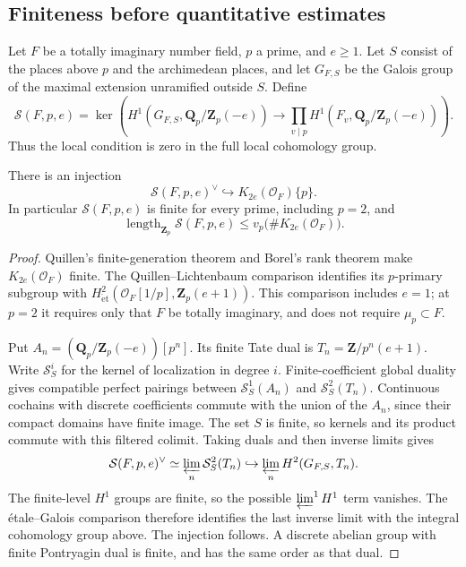 \subsection{Finiteness before quantitative estimates}

Let \(F\) be a totally imaginary number field, \(p\) a prime,
and \(e\ge1\).  Let \(S\) consist of the places above \(p\)
and the archimedean places, and let \(G_{F,S}\) be the Galois
group of the maximal extension unramified outside \(S\).  Define
\[
 \mathcal S(F,p,e)=\ker\left(
 H^1(G_{F,S},\mathbf Q_p/\mathbf Z_p(-e))
 \longrightarrow\prod_{v\mid p}
             H^1(F_v,\mathbf Q_p/\mathbf Z_p(-e))\right).
\]
Thus the local condition is zero in the full local cohomology group.

\begin{proposition}\label{shared-selmer-finite}
There is an injection
\[
 \mathcal S(F,p,e)^\vee\hookrightarrow K_{2e}(\mathcal O_F)\{p\}.
\]
In particular \(\mathcal S(F,p,e)\) is finite for every prime,
including \(p=2\), and
\[
 \operatorname{length}_{\mathbf Z_p}\mathcal S(F,p,e)
       \le v_p\bigl(\#K_{2e}(\mathcal O_F)\bigr).
\]
\end{proposition}
\begin{proof}
Quillen's finite-generation theorem and Borel's rank theorem make
\(K_{2e}(\mathcal O_F)\) finite.  The Quillen--Lichtenbaum
comparison identifies its \(p\)-primary subgroup with
\(H^2_{\mathrm{\acute et}}(\mathcal O_F[1/p],\mathbf Z_p(e+1))\).
This comparison includes \(e=1\); at \(p=2\) it requires only
that \(F\) be totally imaginary, and does not require
\(\mu_p\subset F\).
\cite[IV, Theorems 1.17--1.18 and 6.9; VI, Theorem 8.2]{weibel-kbook}

Put \(A_n=(\mathbf Q_p/\mathbf Z_p(-e))[p^n]\).
Its finite Tate dual is \(T_n=\mathbf Z/p^n(e+1)\).
Write \(\mathcal S^i_S\) for the kernel of localization in
degree \(i\).  Finite-coefficient global duality gives compatible
perfect pairings between \(\mathcal S^1_S(A_n)\) and
\(\mathcal S^2_S(T_n)\).\cite[I, Theorem 4.10]{milne-adt}
Continuous cochains with discrete coefficients commute with the
union of the \(A_n\), since their compact domains have finite image.
The set \(S\) is finite, so kernels and its product commute with
this filtered colimit.  Taking duals and then inverse limits gives
\[
 \mathcal S(F,p,e)^\vee
   \simeq\varprojlim_n\mathcal S^2_S(T_n)
   \hookrightarrow\varprojlim_n H^2(G_{F,S},T_n).
\]
The finite-level \(H^1\) groups are finite, so the possible
\(\varprojlim^1H^1\) term vanishes.  The \'etale--Galois comparison
therefore identifies the last inverse limit with the integral
cohomology group above.\cite[I, Corollary 4.15; II, Proposition 2.9]{milne-adt}
The injection follows.  A discrete abelian group with finite
Pontryagin dual is finite, and has the same order as that dual.
\end{proof}

